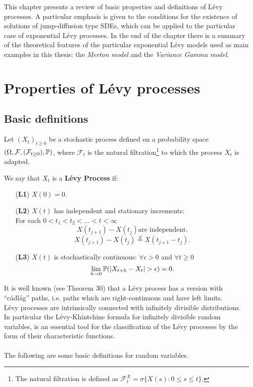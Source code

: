 This chapter presents a review of basic properties and definitions of Lévy processes.
A particular emphasis is given to the conditions for the existence of solutions of jump-diffusion type SDEs, 
which can be applied to the particular case of exponential Lévy processes.
In the end of the chapter there is a summary of the theoretical features of the particular exponential Lévy models used as main examples in this thesis: 
the \emph{Merton model} and the \emph{Variance Gamma model}.

\section{Properties of Lévy processes}

\subsection{Basic definitions}

Let $(X_t)_{t \ge 0}$ be a stochastic process defined on a probability space $(\Omega,\mathcal{F},(\mathcal{F}_{t \ge 0}),\mathbb{P})$, 
where $\mathcal{F}_t$ is the natural filtration\footnote{The natural filtration is defined as $\mathcal{F}_{t}^X = \sigma\{X(s) :
0\leq s \leq t\} $.} to which the process $X_t$ is adapted.\\ 
\begin{Definition}\label{LevyDef}
We say that $X_t$ is a \textbf{Lévy Process} if:
\begin{itemize}
 \item[(\textbf{L1})] $X(0) = 0$.
 \item[(\textbf{L2})] $X(t)$ has independent and stationary increments:\\ For each $0<t_1<t_2 <... <t<\infty$
   $$ X(t_{j+1})-X(t_j) \mbox{are independent.} $$
   $$ X(t_{j+1})-X(t_j) \overset{d}{=} X(t_{j+1}- t_{j}). $$ 
 \item[(\textbf{L3})] $X(t)$ is stochastically continuous: $\forall \epsilon > 0 $ and $\forall t \ge 0$  $$\lim_{h\to 0} \mathbb{P}(|X_{t+h}-X_t| > \epsilon)=0. $$ 
\end{itemize}
\end{Definition}
It is well known (see \cite{Protter} Theorem 30) that a Lévy process has a version with ``cádlág''
paths, i.e. paths which are right-continuous and have left limits. \\
Lévy processes are intrinsically connected with infinitely divisible distributions. In particular the Lévy-Khintchine formula 
for infinitely divisible random variables, is an essential tool for the classification of the Lévy processes by the form of their
characteristic functions.\\
\\
The following are some basic definitions for random variables.  

